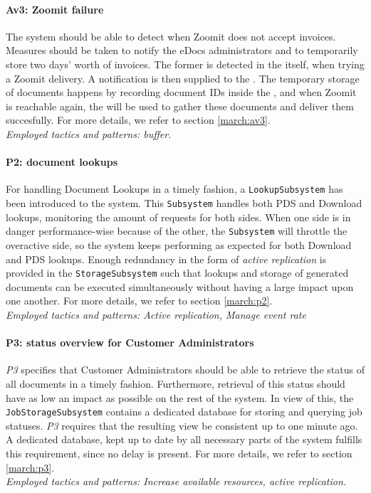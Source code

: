 \paragraph{Av3: Zoomit failure} The system should be able to detect when Zoomit does not accept invoices. Measures should be taken to notify the eDocs administrators and to temporarily store two days' worth of invoices. The former is detected in the  itself, when trying a Zoomit delivery. A notification is then supplied to the . The temporary storage of documents happens by recording document IDs inside the , and when Zoomit is reachable again, the  will be used to gather these documents and deliver them succesfully. For more details, we refer to section \ref{march:av3}.\\
\emph{Employed tactics and patterns: buffer.}
    
\paragraph{P2: document lookups}
For handling Document Lookups in a timely fashion, a \texttt{LookupSubsystem} has been introduced to the system. This \texttt{Subsystem} handles both PDS and Download lookups, monitoring the amount of requests for both sides. When one side is in danger performance-wise because of the other, the \texttt{Subsystem} will throttle the overactive side, so the system keeps performing as expected for both Download and PDS lookups. Enough redundancy in the form of \emph{active replication} is provided in the \texttt{StorageSubsystem} such that lookups and storage of generated documents can be executed simultaneously without having a large impact upon one another. For more details, we refer to section \ref{march:p2}.\\
\emph{Employed tactics and patterns: Active replication, Manage event rate}
    
\paragraph{P3: status overview for Customer Administrators} \emph{P3} specifies that Customer Administrators should be able to retrieve the status of all documents in a timely fashion. Furthermore, retrieval of this status should have as low an impact as possible on the rest of the system. In view of this, the \texttt{JobStorageSubsystem} contains a dedicated database for storing and querying job statuses. \emph{P3} requires that the resulting view be consistent up to one minute ago. A dedicated database, kept up to date by all necessary parts of the system fulfills this requirement, since no delay is present. For more details, we refer to section \ref{march:p3}.\\
\emph{Employed tactics and patterns: Increase available resources, active replication.}
    
